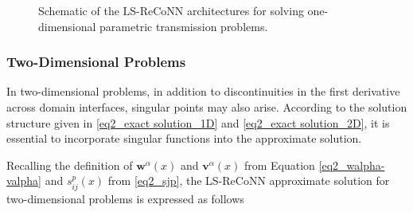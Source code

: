 \documentclass[oneside]{article}
\newcounter{reviewer}
\newcounter{point}[reviewer]
\begin{document}
\begin{figure}[htbp]
\begin{center}

\end{center}		
\caption{Schematic of the LS-ReCoNN architectures for solving one-dimensional parametric transmission problems.}\label{fig_LS_ReCoNN_1D}
\end{figure}



\subsubsection*{Two-Dimensional Problems}
In two-dimensional problems, in addition to discontinuities in the first derivative across domain interfaces, singular points may also arise. According to the solution structure given in \eqref{eq2_exact solution_1D} and \eqref{eq2_exact solution_2D}, it is essential to incorporate singular functions into the approximate solution. 



\noindent Recalling the definition of $\mathbf{w}^\alpha(x)$ and $\mathbf{v}^\alpha(x)$ from Equation \eqref{eq2_walpha-valpha} and $s^p_{ij}(x)$ from \eqref{eq2_sjp}, the LS-ReCoNN approximate solution for two-dimensional problems is expressed as follows
\end{document}
